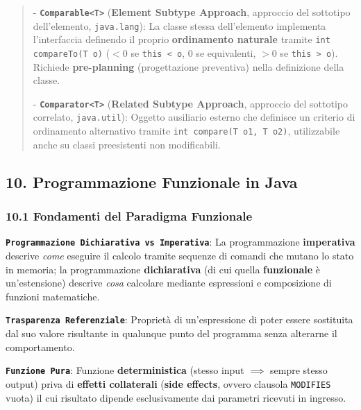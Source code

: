 \begin{quote}\small

- \textbf{\texttt{Comparable<T>}} (\textbf{Element Subtype Approach}, approccio del sottotipo dell'elemento, \texttt{java.lang}): La classe stessa dell'elemento implementa l'interfaccia definendo il proprio \textbf{ordinamento naturale} tramite \texttt{int compareTo(T o)} ($< 0$ se \texttt{this < o}, $0$ se equivalenti, $> 0$ se \texttt{this > o}). Richiede \textbf{pre-planning} (progettazione preventiva) nella definizione della classe.

- \textbf{\texttt{Comparator<T>}} (\textbf{Related Subtype Approach}, approccio del sottotipo correlato, \texttt{java.util}): Oggetto ausiliario esterno che definisce un criterio di ordinamento alternativo tramite \texttt{int compare(T o1, T o2)}, utilizzabile anche su classi preesistenti non modificabili.

\end{quote}

\subsection{10. Programmazione Funzionale in Java}\label{10-programmazione-funzionale-in-java}

\subsubsection{10.1 Fondamenti del Paradigma Funzionale}\label{10-1-fondamenti-del-paradigma-funzionale}

\textbf{\texttt{Programmazione Dichiarativa vs Imperativa}}: La programmazione \textbf{imperativa} descrive \emph{come} eseguire il calcolo tramite sequenze di comandi che mutano lo stato in memoria; la programmazione \textbf{dichiarativa} (di cui quella \textbf{funzionale} è un'estensione) descrive \emph{cosa} calcolare mediante espressioni e composizione di funzioni matematiche.

\textbf{\texttt{Trasparenza Referenziale}}: Proprietà di un'espressione di poter essere sostituita dal suo valore risultante in qualunque punto del programma senza alterarne il comportamento.

\textbf{\texttt{Funzione Pura}}: Funzione \textbf{deterministica} (stesso input $\implies$ sempre stesso output) priva di \textbf{effetti collaterali} (\textbf{side effects}, ovvero clausola \texttt{MODIFIES} vuota) il cui risultato dipende esclusivamente dai parametri ricevuti in ingresso.

